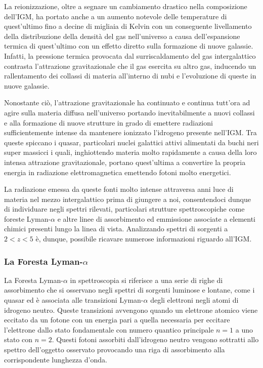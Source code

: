 \documentclass[a4paper,12pt]{article}
\begin{document}
La reionizzazione, oltre a segnare un cambiamento drastico nella composizione dell'IGM, ha portato anche a un aumento notevole delle temperature di quest'ultimo fino a decine di migliaia di Kelvin con un conseguente livellamento della distribuzione della densità del gas nell'universo a causa dell'espansione termica di quest'ultimo con un effetto diretto sulla formazione di nuove galassie. Infatti, la pressione termica provocata dal surriscaldamento del gas intergalattico contrasta l'attrazione gravitazionale che il gas esercita su altro gas, inducendo un rallentamento dei collassi di materia all'interno di nubi e l'evoluzione di queste in nuove galassie.

Nonostante ciò, l'attrazione gravitazionale ha continuato e continua tutt'ora ad agire sulla materia diffusa nell'universo portando inevitabilmente a nuovi collassi e alla formazione di nuove strutture in grado di emettere radiazioni sufficientemente intense da mantenere ionizzato l'idrogeno presente nell'IGM. Tra queste spiccano i quasar, particolari nuclei galattici attivi alimentati da buchi neri super massicci i quali, inghiottendo materia molto rapidamente a causa della loro intensa attrazione gravitazionale, portano quest'ultima a convertire la propria energia in radiazione elettromagnetica emettendo fotoni molto energetici.

La radiazione emessa da queste fonti molto intense attraversa anni luce di materia nel mezzo intergalattico prima di giungere a noi, consentendoci dunque di individuare negli spettri rilevati, particolari strutture spettroscopiche come foreste Lyman-$\alpha$ e altre linee di assorbimento ed emmissione associate a elementi chimici presenti lungo la linea di vista. 
Analizzando spettri di sorgenti a $2<z<5$ è, dunque, possibile ricavare numerose informazioni riguardo all'IGM.




\subsubsection{La Foresta Lyman-$\alpha$}
La Foresta Lyman-$\alpha$ in spettroscopia si riferisce a una serie di righe di assorbimento che si osservano negli spettri di sorgenti luminose e lontane, come i quasar ed è associata alle transizioni Lyman-$\alpha$ degli elettroni negli atomi di idrogeno neutro. Queste transizioni avvengono quando un elettrone atomico viene eccitato da un fotone con un energia pari a quella necessaria per eccitare l'elettrone dallo stato fondamentale con numero quantico principale $n = 1$ a uno stato con $n = 2$. Questi fotoni assorbiti dall'idrogeno neutro vengono sottratti allo spettro dell'oggetto osservato provocando una riga di assorbimento alla corrispondente lunghezza d'onda. 
\end{document}
